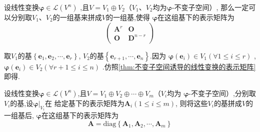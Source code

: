 \begin{green}
\begin{corollary}[两个不变子空间]\label{cor:两个不变子空间}
    设线性变换$\bm{\varphi}\in \mathcal{L}\left(V^n\right)$
    ,且$V=V_1\oplus V_2$（$V_1$、$V_2$均为$\bm{\varphi}$-不变子空间）,
    那么一定可以分别取$V_1$、$V_2$的一组基来拼成$V$的一组基,使得
    $\bm{\varphi}$在这组基下的表示矩阵为
    \[
    \begin{pmatrix}
        \bm{A}^r&\bm{O}\quad\,\\
        \bm{O}&\bm{D}^{n-r}
    \end{pmatrix}
    \]
\end{corollary}
\begin{Proof}
取$V_1$的基$\left\{\bm{e}_1,\bm{e}_2,\cdots,\bm{e}_r\right\}$,
$V_2$的基$\left\{\bm{e}_{r+1},\cdots,\bm{e}_n\right\}$.因为
$\bm{\varphi}\left(\bm{e}_i\right)\in V_1\left(\forall 1\leqslant i\leqslant r\right)$
,$\bm{\varphi}\left(\bm{e}_i\right)\in V_2\left(\forall r+1\leqslant i\leqslant n\right)$
.仿照\cref{thm:不变子空间诱导的线性变换的表示矩阵}即得.
\end{Proof}
\end{green}
\begin{green}
\begin{corollary}[多个不变子空间]\label{cor:多个不变子空间}
    设线性变换$\bm{\varphi}\in \mathcal{L}\left(
        V^n
    \right)$,且$V=V_1\oplus V_2\oplus \cdots \oplus V_m$（$V_i$均为
    $\bm{\varphi}$-不变子空间）,分别取$V_i$的基,设$\bm{\varphi}\big |_{V_i}$在
    给定基下的表示矩阵为$\bm{A}_i\left(1\leqslant i \leqslant m\right)$,
    则将这些$V_i$的基拼成$V$的一组基后,
    $\bm{\varphi}$在这组基下的表示矩阵为\[\bm{A}=
    \mathrm{diag}\left\{
        \bm{A}_1,\bm{A}_2,\cdots,\bm{A}_m
    \right\}\]
\end{corollary}
\end{green}
